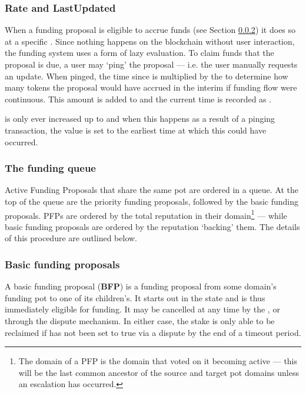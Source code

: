 \subsubsection{Rate and LastUpdated}
When a funding proposal is eligible to accrue funds (see Section \ref{subsec:funding-queue}) it does so at a specific . Since nothing happens on the blockchain without user interaction, the funding system uses a form of lazy evaluation. To claim funds that the proposal is due, a user may `ping' the proposal --- i.e. the user manually requests an update. When pinged, the time since  is multiplied by the  to determine how many tokens the proposal would have accrued in the interim if funding flow were continuous. This amount is added to  and the current time is recorded as .

 is only ever increased up to  and when this happens as a result of a pinging transaction, the  value is set to the earliest time at which this could have occurred.

\subsubsection{The funding queue}\label{subsec:funding-queue}
Active Funding Proposals that share the same  pot are ordered in a queue. At the top of the queue are the priority funding proposals, followed by the basic funding proposals. PFPs are ordered by the total reputation in their domain\footnote{The domain of a PFP is the domain that voted on it becoming active --- this will be the last common ancestor of the source and target pot domains unless an escalation has occurred.} --- while basic funding proposals are ordered by the reputation `backing' them.  The details of this procedure are outlined below.

%
%
%

\subsubsection{Basic funding proposals}\label{subsubsec:BFPs}
A basic funding proposal (\textbf{BFP}) is a funding proposal from some domain's funding pot to one of its children's. It starts out in the  state and is thus immediately eligible for funding. It may be cancelled at any time by the , or through the dispute mechanism. In either case, the stake is only able to be reclaimed if  has not been set to true via a dispute by the end of a timeout period.

